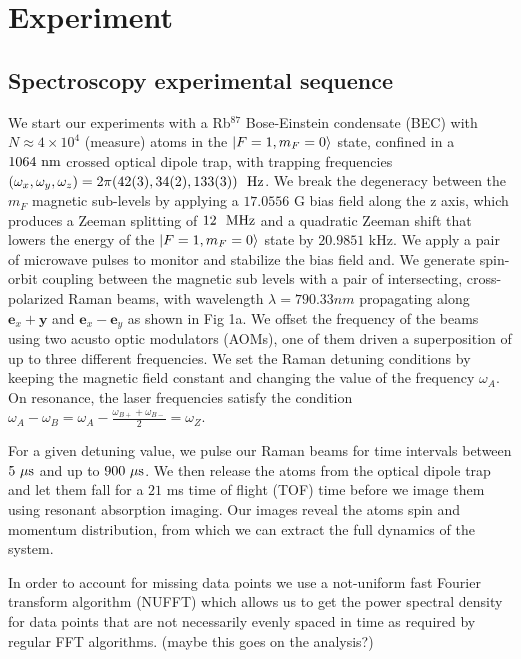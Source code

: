 \section{Experiment}

 

\subsection{Spectroscopy experimental sequence}


We start our experiments with a Rb$^{87}$ Bose-Einstein condensate (BEC) with $N\approx 4\times 10^4$ (measure) atoms in the $|F=1,m_F=0\rangle$ state, confined in a $1064{\ {\rm nm}}$ crossed optical dipole trap, with trapping frequencies $(\omega_x,\omega_y,\omega_z)=2\pi(42(3),34(2),133(3))\ \Hz$. We break the degeneracy between the $m_F$ magnetic sub-levels by applying a $17.0556$ G bias field along the z axis, which produces a Zeeman splitting of $12 \ {\ {\rm MHz}}$ and a quadratic Zeeman shift that lowers the energy of the $|F=1,m_F=0\rangle$ state  by $20.9851$ kHz. 
We apply a pair of microwave pulses to monitor and stabilize the bias field and. We generate spin-orbit coupling between the magnetic sub levels with a pair of intersecting, cross-polarized Raman beams, with wavelength $\lambda=790.33 nm$ propagating along $\mathbf{e}_x+\mathbf{y}$ and $\mathbf{e}_x-\mathbf{e}_y$ as shown in Fig 1a. We offset the frequency of the beams using two acusto optic modulators (AOMs), one of them driven a superposition of up to three different frequencies. We set the Raman detuning conditions by keeping the magnetic field constant and changing the value of the frequency $\omega_A$.  On resonance, the laser frequencies satisfy the condition $\omega_A-\omega_B=\omega_A-\frac{\omega_{B+}+\omega_{B-}}{2}=\omega_Z$. 

For a given detuning value, we pulse our Raman beams for time intervals between $5{\ \mu{\rm s}}$ and up to $900{\ \mu{\rm s}}$. We then release the atoms from the optical dipole trap and let them fall for a $21$ ms time of flight (TOF) time before we image them using resonant absorption imaging. Our images 
reveal the atoms spin and momentum distribution, from which we can extract the full dynamics of the system. 


In order to account for missing data points we use a not-uniform fast Fourier transform algorithm (NUFFT) which allows us to get the power spectral density for data points that are not necessarily evenly spaced in time as required by regular FFT algorithms. (maybe this goes on the analysis?)


